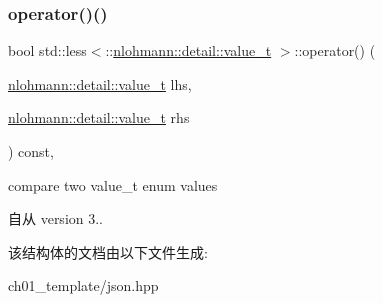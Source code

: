 \subsubsection{\texorpdfstring{operator()()}{operator()()}}
{\footnotesize\ttfamily bool std\+::less$<$\+::\mbox{\hyperlink{namespacenlohmann_1_1detail_a1ed8fc6239da25abcaf681d30ace4985}{nlohmann\+::detail\+::value\+\_\+t}} $>$\+::operator() (\begin{DoxyParamCaption}\item[{\mbox{\hyperlink{namespacenlohmann_1_1detail_a1ed8fc6239da25abcaf681d30ace4985}{nlohmann\+::detail\+::value\+\_\+t}}}]{lhs,  }\item[{\mbox{\hyperlink{namespacenlohmann_1_1detail_a1ed8fc6239da25abcaf681d30ace4985}{nlohmann\+::detail\+::value\+\_\+t}}}]{rhs }\end{DoxyParamCaption}) const\hspace{0.3cm}{\ttfamily [inline]}, {\ttfamily [noexcept]}}



compare two value\+\_\+t enum values 

\begin{DoxySince}{自从}
version 3.. 
\end{DoxySince}


该结构体的文档由以下文件生成\+:\begin{DoxyCompactItemize}
\item 
ch01\+\_\+template/json.\+hpp\end{DoxyCompactItemize}
